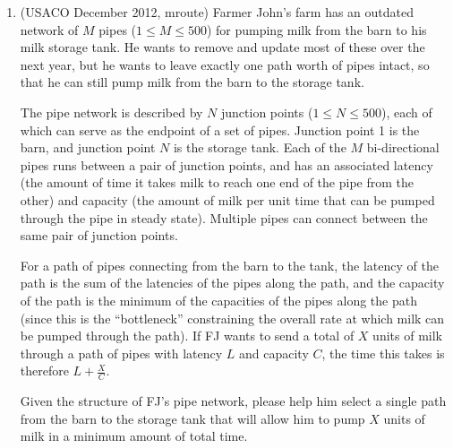 \begin{enumerate}
\item
(USACO December 2012, mroute)
Farmer John's farm has an outdated network of $M$ pipes ($1 \le M \le 500$) for
pumping milk from the barn to his milk storage tank.  He wants to remove
and update most of these over the next year, but he wants to leave exactly
one path worth of pipes intact, so that he can still pump milk from the
barn to the storage tank.

The pipe network is described by $N$ junction points ($1 \le N \le 500$), each of
which can serve as the endpoint of a set of pipes.  Junction point 1 is the
barn, and junction point $N$ is the storage tank.  Each of the $M$
bi-directional pipes runs between a pair of junction points, and has an
associated latency (the amount of time it takes milk to reach one end of
the pipe from the other) and capacity (the amount of milk per unit time
that can be pumped through the pipe in steady state).  Multiple pipes
can connect between the same pair of junction points.

For a path of pipes connecting from the barn to the tank, the latency
of the path is the sum of the latencies of the pipes along the path,
and the capacity of the path is the minimum of the capacities of the
pipes along the path (since this is the ``bottleneck'' constraining the
overall rate at which milk can be pumped through the path).  If FJ
wants to send a total of $X$ units of milk through a path of pipes with
latency $L$ and capacity $C$, the time this takes is therefore $L + \frac{X}{C}$.

Given the structure of FJ's pipe network, please help him select a single
path from the barn to the storage tank that will allow him to pump $X$ units
of milk in a minimum amount of total time.


\end{enumerate}
